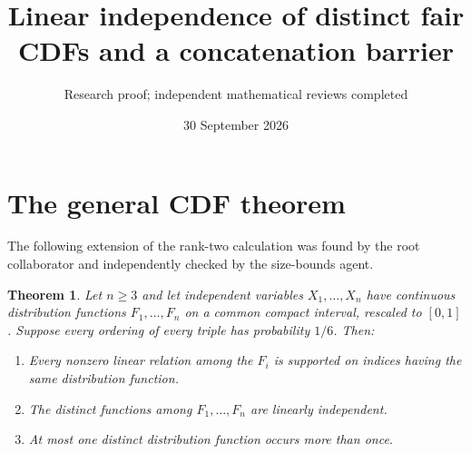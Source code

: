 \documentclass[11pt]{article}
\title{Linear independence of distinct fair CDFs and a concatenation barrier}
\author{Research proof; independent mathematical reviews completed}
\date{30 September 2026}
\newtheorem{theorem}{Theorem}
\begin{document}
\maketitle

\section{The general CDF theorem}
The following extension of the rank-two calculation was found by the
root collaborator and independently checked by the size-bounds agent.

\begin{theorem}\label{cdf}
Let $n\ge3$ and let independent variables $X_1,\ldots,X_n$ have
continuous distribution functions $F_1,\ldots,F_n$ on a common compact
interval, rescaled to $[0,1]$. Suppose every ordering of every triple
has probability $1/6$. Then:
\begin{enumerate}
\item Every nonzero linear relation among the $F_i$ is supported on
indices having the same distribution function.
\item The distinct functions among $F_1,\ldots,F_n$ are linearly independent.
\item At most one distinct distribution function occurs more than once.
\end{enumerate}
\end{theorem}
\end{document}
